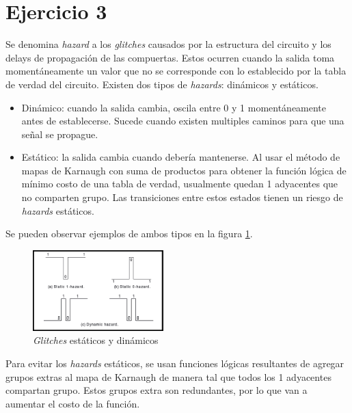 \documentclass[../../e3_tp2_main.tex]{subfiles}
\begin{document}
\section{Ejercicio 3}

Se denomina \textit{hazard} a los \textit{glitches} causados por la estructura del circuito y los delays de propagaci\'on de las compuertas. Estos ocurren cuando la salida toma moment\'aneamente un valor que no se corresponde con lo establecido por la tabla de verdad del circuito. Existen dos tipos de \textit{hazards}: din\'amicos y est\'aticos. \par
\begin{itemize}
	\item Din\'amico: cuando la salida cambia, oscila entre 0 y 1 moment\'aneamente antes de establecerse. Sucede cuando existen multiples caminos para que una se\~nal se propague. 
	\item Est\'atico: la salida cambia cuando deber\'ia mantenerse. Al usar el m\'etodo de mapas de Karnaugh con suma de productos para obtener la funci\'on l\'ogica de m\'inimo costo de una tabla de verdad, usualmente quedan 1 adyacentes que no comparten grupo. Las transiciones entre estos estados tienen un riesgo de \textit{hazards} est\'aticos. 
\end{itemize}
\par
Se pueden observar ejemplos de ambos tipos en la figura \ref{fig:ej_3_hazards}.


\begin{figure}[H]	%
	\centering
	\includegraphics[width=0.45\textwidth]{hazard.png}
	\caption{\textit{Glitches} est\'aticos y din\'amicos\protect\footnotemark}
	\label{fig:ej_3_hazards}
\end{figure}



Para evitar los \textit{hazards} est\'aticos, se usan funciones l\'ogicas resultantes de agregar grupos extras al mapa de Karnaugh de manera tal que todos los 1 adyacentes compartan grupo. Estos grupos extra son redundantes, por lo que van a aumentar el costo de la funci\'on.
\end{document}

